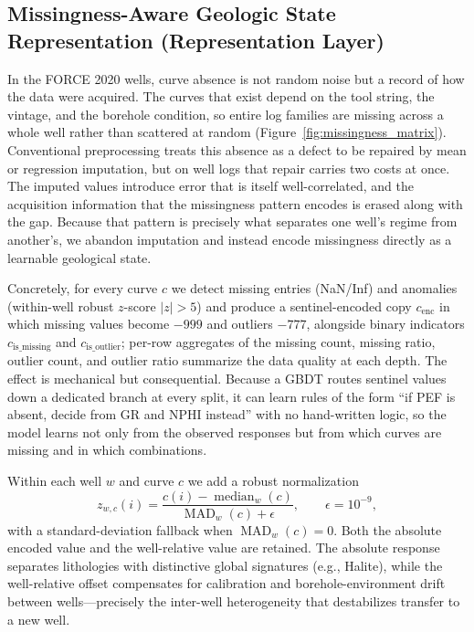 \documentclass[bdcc,article,submit,pdftex,moreauthors]{Definitions/mdpi}
\begin{document}
\subsection{Missingness-Aware Geologic State Representation (Representation Layer)}
\label{sec:repr}
In the FORCE 2020 wells, curve absence is not random noise but a record of how the data were
acquired. The curves that exist depend on the tool string, the vintage, and the borehole
condition, so entire log families are missing across a whole well rather than scattered at
random (Figure~\ref{fig:missingness_matrix}). Conventional preprocessing treats this absence as a
defect to be repaired by mean or regression imputation, but on well logs that repair carries
two costs at once. The imputed values introduce error that is itself well-correlated, and the
acquisition information that the missingness pattern encodes is erased along with the gap.
Because that pattern is precisely what separates one well's regime from another's, we abandon
imputation and instead encode missingness directly as a learnable geological state.

Concretely, for every curve $c$ we detect missing entries (NaN/Inf) and anomalies (within-well
robust $z$-score $|z|>5$) and produce a sentinel-encoded copy $c_\text{enc}$ in which missing
values become $-999$ and outliers $-777$, alongside binary indicators $c_\text{is\_missing}$
and $c_\text{is\_outlier}$; per-row aggregates of the missing count, missing ratio, outlier
count, and outlier ratio summarize the data quality at each depth. The effect is mechanical
but consequential. Because a GBDT routes sentinel values down a dedicated branch at every
split, it can learn rules of the form ``if PEF is absent, decide from GR and NPHI instead''
with no hand-written logic, so the model learns not only from the observed responses but from
which curves are missing and in which combinations.

Within each well $w$ and curve $c$ we add a robust normalization
\begin{equation}
z_{w,c}(i) = \frac{c(i)-\operatorname{median}_w(c)}{\operatorname{MAD}_w(c)+\epsilon},\qquad \epsilon=10^{-9},
\label{eq:zscore}
\end{equation}
with a standard-deviation fallback when $\operatorname{MAD}_w(c)=0$. Both the absolute
encoded value and the well-relative value are retained. The absolute response separates
lithologies with distinctive global signatures (e.g., Halite), while the well-relative offset
compensates for calibration and borehole-environment drift between wells---precisely the
inter-well heterogeneity that destabilizes transfer to a new well.
\end{document}
